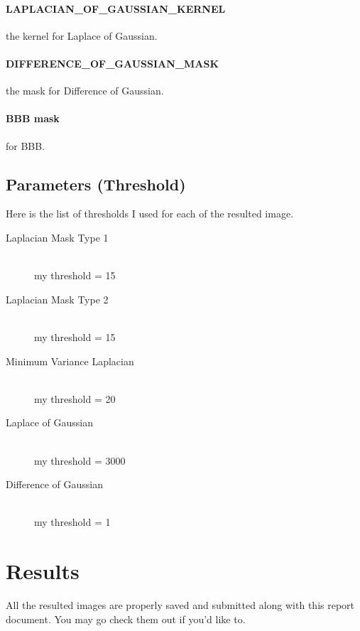 \documentclass{article}
\begin{document}
\paragraph{LAPLACIAN\_OF\_GAUSSIAN\_KERNEL} the kernel for Laplace of Gaussian.
\paragraph{DIFFERENCE\_OF\_GAUSSIAN\_MASK} the mask for Difference of Gaussian.
\paragraph{BBB mask} for BBB.

\subsection{Parameters (Threshold)}
Here is the list of thresholds I used for each of the resulted image.
\begin{description}
  \item[Laplacian Mask Type 1] \hfill \\
  my threshold = 15
  \item[Laplacian Mask Type 2] \hfill \\
  my threshold = 15
  \item[Minimum Variance Laplacian] \hfill \\
  my threshold = 20
  \item[Laplace of Gaussian] \hfill \\
  my threshold = 3000
  \item[Difference of Gaussian] \hfill \\
  my threshold = 1
\end{description}

\section{Results}
All the resulted images are properly saved and submitted along with this report document. You may go check them out if you'd like to.
\end{document}
